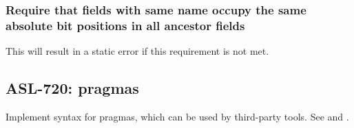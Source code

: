 \subsubsection{Require that fields with same name occupy the same absolute bit
positions in all ancestor fields}

This will result in a static error if this requirement is not met.

\subsection{ASL-720: pragmas}

Implement syntax for pragmas, which can be used by third-party tools.
See  and .

